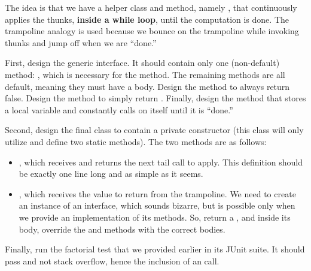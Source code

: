 The idea is that we have a helper class and method, namely , that continuously applies the thunks, \textbf{inside a while loop}, until the computation is done. The trampoline analogy is used because we bounce on the trampoline while invoking thunks and jump off when we are ``done.''

First, design the generic  interface. It should contain only one (non-default) method: , which is necessary for the  method. The remaining methods are all default, meaning they must have a body. Design the  method to always return false. Design the  method to simply return . Finally, design the  method that stores a local variable and constantly calls  on itself until it is ``done.'' 

Second, design the  final class to contain a private constructor (this class will only utilize and define two static methods). The two methods are as follows:

\begin{itemize}
  \item {}, which receives and returns the next tail call to apply. This definition should be exactly one line long and as simple as it seems.
  \item {}, which receives the value to return from the trampoline. We need to create an instance of an interface, which sounds bizarre, but is possible only when we provide an implementation of its methods. So, return a , and inside its body, override the  and  methods with the correct bodies.
\end{itemize}

Finally, run the factorial test that we provided earlier in its JUnit suite. It should pass and not stack overflow, hence the inclusion of an  call.


